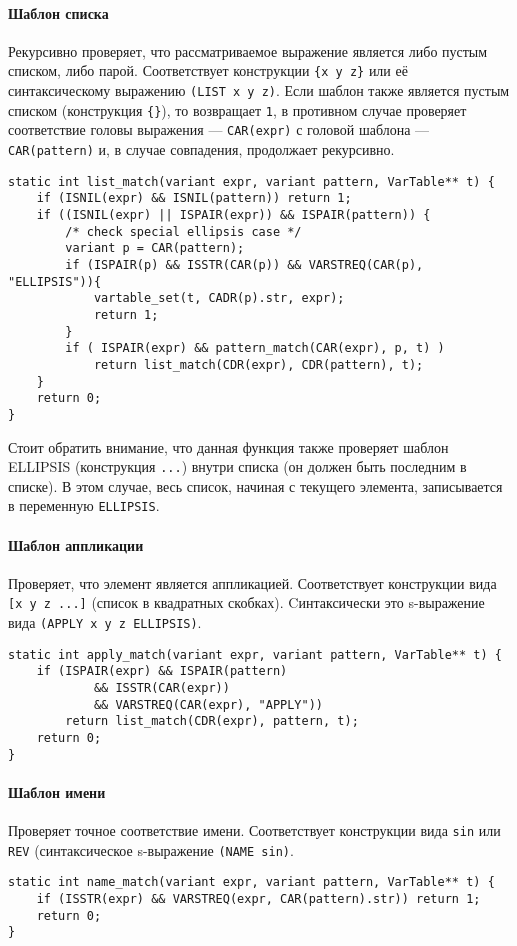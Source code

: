 \documentclass[10pt]{report}
\begin{document}
\paragraph{Шаблон списка} Рекурсивно проверяет, что рассматриваемое выражение является либо пустым списком, либо парой. Соответствует конструкции \verb|{x y z}| или её синтаксическому выражению \verb|(LIST x y z)|. Если шаблон также является пустым списком (конструкция \verb|{}|), то возвращает \verb|1|, в противном случае проверяет соответствие головы выражения --- \verb|CAR(expr)| с головой шаблона  --- \verb|CAR(pattern)| и, в случае совпадения, продолжает рекурсивно.
\begin{lstlisting}[firstnumber=40]
static int list_match(variant expr, variant pattern, VarTable** t) {
	if (ISNIL(expr) && ISNIL(pattern)) return 1;
	if ((ISNIL(expr) || ISPAIR(expr)) && ISPAIR(pattern)) {
		/* check special ellipsis case */
		variant p = CAR(pattern);
		if (ISPAIR(p) && ISSTR(CAR(p)) && VARSTREQ(CAR(p), "ELLIPSIS")){ 
			vartable_set(t, CADR(p).str, expr); 
			return 1;
		} 
		if ( ISPAIR(expr) && pattern_match(CAR(expr), p, t) )
			return list_match(CDR(expr), CDR(pattern), t);
	}
	return 0;
}
\end{lstlisting}
Стоит обратить внимание, что данная функция также проверяет шаблон ELLIPSIS (конструкция \verb|...|) внутри списка (он должен быть последним в списке). В этом случае,  весь список, начиная с текущего элемента, записывается в переменную \verb|ELLIPSIS|. 
\paragraph{Шаблон аппликации} Проверяет, что элемент является аппликацией. Соответствует конструкции вида \verb|[x y z ...]| (список в квадратных скобках). Cинтаксически это s-выражение вида \verb|(APPLY x y z ELLIPSIS)|.
\begin{lstlisting}[firstnumber=55]
static int apply_match(variant expr, variant pattern, VarTable** t) {
	if (ISPAIR(expr) && ISPAIR(pattern) 
			&& ISSTR(CAR(expr))
			&& VARSTREQ(CAR(expr), "APPLY")) 
		return list_match(CDR(expr), pattern, t);
	return 0;
}
\end{lstlisting}
\paragraph{Шаблон имени} Проверяет точное соответствие имени. Соответствует конструкции вида \verb|sin| или \verb|REV| (синтаксическое s-выражение \verb|(NAME sin)|.
\begin{lstlisting}[firstnumber=63]
static int name_match(variant expr, variant pattern, VarTable** t) {
	if (ISSTR(expr) && VARSTREQ(expr, CAR(pattern).str)) return 1;
	return 0;
}
\end{lstlisting}
\end{document}
